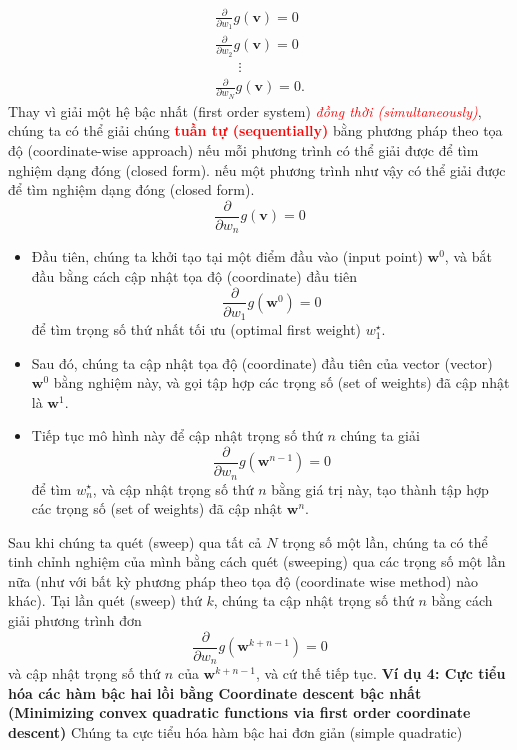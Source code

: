 \documentclass{book}
\begin{document}
\begin{equation}
\begin{array}{c}
    \frac{\partial}{\partial w_{1}}g(\mathbf{v})=0\\
    \frac{\partial}{\partial w_{2}}g(\mathbf{v})=0\\
    \,\,\,\,\,\,\,\,\,\,\vdots \\
    \frac{\partial}{\partial w_{N}}g(\mathbf{v})=0.
\end{array}
\end{equation}
Thay vì giải một hệ bậc nhất (first order system) \textit{\textcolor{red}{đồng thời (simultaneously)}}, chúng ta có thể giải chúng \textbf{\textcolor{red}{tuần tự (sequentially)}} bằng phương pháp theo tọa độ (coordinate-wise approach) nếu mỗi phương trình có thể giải được để tìm nghiệm dạng đóng (closed form).
nếu một phương trình như vậy có thể giải được để tìm nghiệm dạng đóng (closed form).
\begin{equation*}
    \frac{\partial}{\partial w_{n}}g(\mathbf{v})=0
\end{equation*}
\begin{itemize}
    \item Đầu tiên, chúng ta khởi tạo tại một điểm đầu vào (input point) $\mathbf{w}^0$, và bắt đầu bằng cách cập nhật tọa độ (coordinate) đầu tiên
    \begin{equation*}
        \frac{\partial}{\partial w_{1}}g\left(\mathbf{w}^0\right)=0 
    \end{equation*}
    để tìm trọng số thứ nhất tối ưu (optimal first weight) $w_1^{\star}$.  
    \item Sau đó, chúng ta cập nhật tọa độ (coordinate) đầu tiên của vector (vector) $\mathbf{w}^0$ bằng nghiệm này, và gọi tập hợp các trọng số (set of weights) đã cập nhật là $\mathbf{w}^1$.
    \item Tiếp tục mô hình này để cập nhật trọng số thứ $n$ chúng ta giải
    \begin{equation*}
        \frac{\partial}{\partial w_{n}}g\left(\mathbf{w}^{n-1}\right)=0 
    \end{equation*}
    để tìm $w_n^{\star}$, và cập nhật trọng số thứ $n$ bằng giá trị này, tạo thành tập hợp các trọng số (set of weights) đã cập nhật $\mathbf{w}^n$.  
\end{itemize}
Sau khi chúng ta quét (sweep) qua tất cả $N$ trọng số một lần, chúng ta có thể tinh chỉnh nghiệm của mình bằng cách quét (sweeping) qua các trọng số một lần nữa (như với bất kỳ phương pháp theo tọa độ (coordinate wise method) nào khác). Tại lần quét (sweep) thứ $k$, chúng ta cập nhật trọng số thứ $n$ bằng cách giải phương trình đơn
\begin{equation*}
    \frac{\partial}{\partial w_{n}}g\left(\mathbf{w}^{k + n-1}\right)=0 
\end{equation*}
và cập nhật trọng số thứ $n$ của $\mathbf{w}^{k + n-1}$, và cứ thế tiếp tục.
\textbf{Ví dụ 4: Cực tiểu hóa các hàm bậc hai lồi bằng Coordinate descent bậc nhất (Minimizing convex quadratic functions via first order coordinate descent)}
Chúng ta cực tiểu hóa hàm bậc hai đơn giản (simple quadratic)
\end{document}
